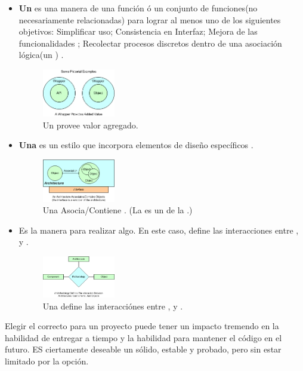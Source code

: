 \begin{itemize}
	\item \textbf{Un \wrapperAS} es una manera de \repackagingAS una función ó un conjunto de funciones(no necesariamente relacionadas) para lograr al menos uno de los siguientes objetivos: Simplificar uso; Consistencia en Interfaz; Mejora de las funcionalidades \coreAS; Recolectar procesos discretos dentro de una asociación lógica(un \objectPL) \cite{online_codeProject_what_is_framework}.

		\begin{figure}[h!]
			\centering
			\includegraphics[width=0.3\textwidth]{figuras/framework_component_wrapper.jpg}
			\caption{Un \wrapperAS provee valor agregado.}
			\label{figure:framework_component_wrapper}
		\end{figure}

	\item \textbf{Una \architectureCPT} es un estilo que incorpora elementos de diseño específicos \cite{online_codeProject_what_is_framework}.

		\begin{figure}[h!]
			\centering
			\includegraphics[width=0.3\textwidth]{figuras/framework_component_architecture.jpg}
			\caption{Una \architectureCPT Asocia/Contiene \objectsPL. (La \interfaceAS es un \wrapperAS de la \architectureCPT.)}
			\label{figure:framework_component_architecture}
		\end{figure}

	\item \textbf{\methodologyCPT} Es la manera para realizar algo. En este caso, define las interacciones entre \architectureCPT, \componentsAS y \objectsPL \cite{online_codeProject_what_is_framework}.

		\begin{figure}[h!]
			\centering
			\includegraphics[width=0.3\textwidth]{figuras/framework_component_methodology.jpg}
			\caption{Una \methodologyCPT define las interacciónes entre \architectureCPT, \componentsAS y \objectsPL.}
			\label{figure:framework_component_methodology}
		\end{figure}

\end{itemize}

Elegir el \frameworkPC correcto para un proyecto puede tener un impacto tremendo en la habilidad de entregar a tiempo y la habilidad para mantener el código en el futuro. ES ciertamente deseable un \frameworkPC sólido, estable y probado, pero sin estar limitado por la opción.